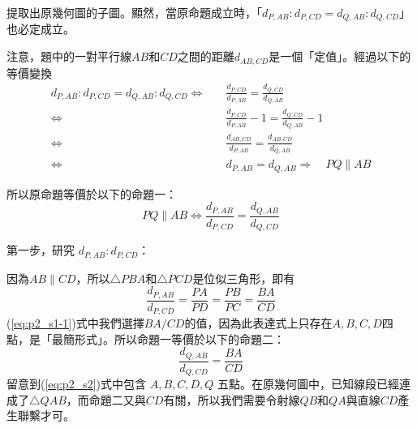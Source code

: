 提取出原幾何圖的子圖。顯然，當原命題成立時，「$d_{P,AB}:d_{P,CD}=d_{Q,AB}:d_{Q,CD}$」也必定成立。

注意，題中的一對平行線$AB$和$CD$之間的距離$d_{AB,CD}$是一個「定值」。經過以下的等價變換
\begin{align*}
  d_{P,AB}:d_{P,CD}=d_{Q,AB}:d_{Q,CD}\Leftrightarrow\quad& \frac{d_{P,CD}}{d_{P,AB}}=\frac{d_{Q,CD}}{d_{Q,AB}}\\ 
  \Leftrightarrow\quad& \frac{d_{P,CD}}{d_{P,AB}}-1=\frac{d_{Q,CD}}{d_{Q,AB}}-1\\ 
  \Leftrightarrow\quad& \frac{d_{AB,CD}}{d_{P,AB}}=\frac{d_{AB,CD}}{d_{Q,AB}}\\ 
  \Leftrightarrow\quad& d_{P,AB}=d_{Q,AB}\Rightarrow\quad PQ\parallel AB
\end{align*}

所以原命題等價於以下的命題一：
\begin{equation}
  PQ\parallel AB\Leftrightarrow\frac{d_{P,AB}}{d_{P,CD}}=\frac{d_{Q,AB}}{d_{Q,CD}}\label{eq:p2_s1}
\end{equation}

\begin{center} %
\end{center}

第一步，研究 $d_{P,AB}:d_{P,CD}$：

因為$AB\parallel CD$，所以$\triangle{PBA}$和$\triangle{PCD}$是位似三角形，即有
\begin{equation}
  \frac{d_{P,AB}}{d_{P,CD}}=\frac{PA}{PD}=\frac{PB}{PC}=\frac{BA}{CD}\label{eq:p2_s1-1}
\end{equation}
(\ref{eq:p2_s1-1})式中我們選擇$BA/CD$的值，因為此表達式上只存在$A,B,C,D$四點，是「最簡形式」。所以命題一等價於以下的命題二：
\begin{equation}
  \frac{d_{Q,AB}}{d_{Q,CD}}=\frac{BA}{CD}\label{eq:p2_s2}
\end{equation}
留意到(\ref{eq:p2_s2})式中包含 $A,B,C,D,Q$ 五點。在原幾何圖中，已知線段已經連成了$\triangle{QAB}$，而命題二又與$CD$有關，所以我們需要令射線$QB$和$QA$與直線$CD$產生聯繫才可。

